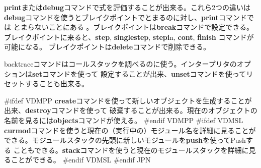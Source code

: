 \documentclass[\pformat,12pt]{article}
\begin{document}
\textbf{print}または\textbf{debug}コマンドで式を評価することが出来る。これら2つの違いは
{\bf debug}コマンドを使うとブレイクポイントでとまるのに対し、{\bf print}コマンドでは
とまらないことにある 。ブレイクポイントは\textbf{break}コマンドで設定できる。
ブレイクポイントに来ると、\textbf{step}, \textbf{singlestep}, \textbf{stepi}n, \textbf{cont}, \textbf{finish} 
コマンドが可能になる。
ブレイクポイントは\textbf{delete}コマンドで削除できる。

backtraceコマンドはコールスタックを調べるのに使う。インタープリタのオプションは\textbf{set}コマンドを使って
設定することが出来、\textbf{unset}コマンドを使ってリセットすることも出来る。

#ifdef VDMPP
\textbf{create}コマンドを使って新しいオブジェクトを生成することが出来、\textbf{destroy}コマンドを使って
破棄することが出来る。現在のオブジェクトの名前を見るには\textbf{objects}コマンドが使える。
#endif VDMPP
#ifdef VDMSL
\textbf{curmod}コマンドを使うと現在の（実行中の）モジュール名を詳細に見ることが
できる。モジュールスタックの先頭に新しいモジュールを\textbf{push}を使ってPushする
こともできる。\textbf{stack}コマンドを使うと現在のモジュールスタックを詳細に見ることができる。
#endif VDMSL
#endif JPN
\end{document}
